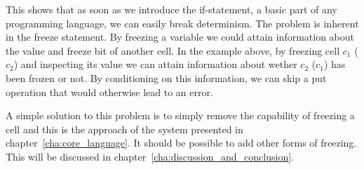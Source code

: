 This shows that as soon as we introduce the if-statement, a basic part of any
programming language, we can easily break determinism. The problem is inherent
in the freeze statement. By freezing a variable we could attain information
about the value and freeze bit of another cell. In the example above, by
freezing cell $c_1$ ($c_2$) and inspecting its value we can attain information
about wether $c_2$ ($c_1$) has been frozen or not. By conditioning on this
information, we can skip a put operation that would otherwise lead to an error.

A simple solution to this problem is to simply remove the capability of freezing
a cell and this is the approach of the system presented in
chapter~\ref{cha:core_language}. It should be possible to add other
forms of freezing. This will be discussed in
chapter~\ref{cha:discussion_and_conclusion}.



